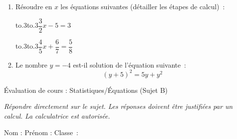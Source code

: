 \documentclass{article}
\begin{document}
\begin{enumerate}[label=\arabic*), font=\bfseries]
\begin{enumerate}[label=\alph*), font=\bfseries]
		l'unité).\dotedline\dotedline\dotedline\dotedline
		\item Un pull coûtant 55\euro\ voit son prix augmenter de 20 \%. Quel est son
		nouveau prix~?\dotedline\dotedline\dotedline
	\end{enumerate}
	\item Résoudre en $x$ les équations suivantes (détailler les étapes de calcul)~:\par\noindent
	\hbox{\hbox to.3\linewidth{$5x=17,5$\hfill}\hbox to.3\linewidth{$9x+5=6$\hfill}\hbox{$\dfrac32x-5=3$\hfill}}\par\noindent\vfill
	\hbox{\hbox to.3\linewidth{$-2x=6$\hfill}\hbox to.3\linewidth{$15-2x=20$\hfill}\hbox{$\dfrac45x+\dfrac67=\dfrac58$\hfill}}\par\vfill
	\item Le nombre $y=-4$ est-il solution de l'équation suivante~:$$(y+5)^2=5y+y^2$$\vskip100pt
\end{enumerate}
\newpage
\begin{center}
    \Large Évaluation de cours : Statistiques/Équations (Sujet B)\par
	{\itshape\normalsize Répondre directement sur le sujet. Les réponses doivent être
	justifiées par un calcul. La calculatrice est autorisée.}
\end{center}
\vskip10pt
Nom : \hskip50pt Prénom : \hskip50pt Classe~:
\vskip20pt
\end{document}
